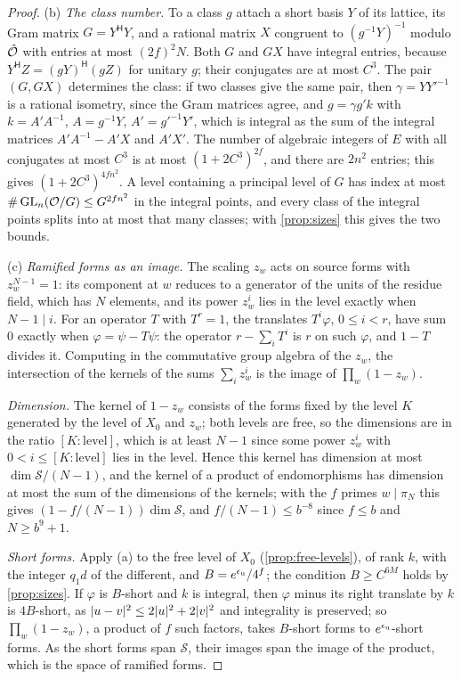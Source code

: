 \begin{proof}
(b) \emph{The class number.} To a class $g$ attach a short basis $Y$ of its lattice, its Gram matrix $G=Y^{\mathsf H}Y$, and a rational matrix $X$ congruent to $(g^{-1}Y)^{-1}$ modulo $\hat{\mathcal{O}}$ with entries at most $(2f)^2N$. Both $G$ and $GX$ have integral entries, because $Y^{\mathsf H}Z=(gY)^{\mathsf H}(gZ)$ for unitary $g$; their conjugates are at most
$C^3$. The pair $(G,GX)$ determines the class: if two classes give the same pair, then $\gamma=YY'^{-1}$ is a rational isometry, since the Gram matrices agree, and $g=\gamma g'k$ with $k=A'A^{-1}$, $A=g^{-1}Y$, $A'=g'^{-1}Y'$, which is integral as the sum of the integral matrices $A'A^{-1}-A'X$ and $A'X'$. The number of algebraic integers of
$E$ with all conjugates at most $C^3$ is at most $(1+2C^3)^{2f}$, and there are $2n^2$ entries; this gives $(1+2C^3)^{4fn^2}$. A level containing a principal level of $G$ has index at most $\#\operatorname{GL}_n(\mathcal{O}/G)\le G^{2fn^2}$ in the integral points, and every class of the integral points splits into at most that many classes; with \cref{prop:sizes} this gives
the two bounds.

(c) \emph{Ramified forms as an image.} The scaling $z_w$ acts on source forms with $z_w^{N-1}=1$: its component at $w$ reduces to a generator of the units of the residue field, which has $N$ elements, and its power $z_w^i$ lies in the level exactly when $N-1\mid i$. For an operator $T$ with $T^r=1$, the translates $T^i\varphi$, $0\le i<r$, have sum $0$ exactly when $\varphi=\psi-T\psi$: the operator
$r-\sum_iT^i$ is $r$ on such $\varphi$, and $1-T$ divides it. Computing in the commutative group algebra of the $z_w$, the intersection of the kernels of the sums $\sum_iz_w^i$ is the image of $\prod_w(1-z_w)$.

\emph{Dimension.} The kernel of $1-z_w$ consists of the forms fixed by the level $K$ generated by the level of $X_0$ and $z_w$; both levels are free, so the dimensions are in the ratio $[K:\mathrm{level}]$, which is at least $N-1$ since some power $z_w^i$ with $0<i\le[K:\mathrm{level}]$ lies in the level. Hence this kernel has dimension at most $\dim\mathcal S/(N-1)$, and the kernel of a product of
endomorphisms has dimension at most the sum of the dimensions of the kernels; with the $f$ primes $w\mid\pi_N$ this gives $(1-f/(N-1))\dim\mathcal S$, and $f/(N-1)\le b^{-8}$ since $f\le b$ and $N\ge b^9+1$.

\emph{Short forms.} Apply (a) to the free level of $X_0$ (\cref{prop:free-levels}), of rank $k$, with the integer $q_1d$ of the different, and $B=e^{\epsilon_{\mathrm{u}}}/4^f$; the condition $B\ge C^{6M}$ holds by \cref{prop:sizes}. If $\varphi$ is $B$-short and $k$ is integral, then $\varphi$ minus its right translate by $k$ is $4B$-short, as
$\lvert u-v\rvert^2\le2\lvert u\rvert^2+2\lvert v\rvert^2$ and integrality is preserved; so $\prod_w(1-z_w)$, a product of $f$ such factors, takes $B$-short forms to $e^{\epsilon_{\mathrm{u}}}$-short forms. As the short forms span $\mathcal S$, their images span the image of the product, which is the space of ramified forms.
\end{proof}

